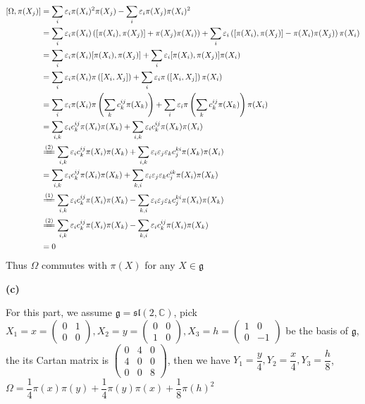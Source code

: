\documentclass[main]{subfiles}
\begin{document}
\begin{align*}\displaystyle
[\Omega,\pi(X_j)]&=\sum_i\varepsilon_i\pi(X_i)^2\pi(X_j)-\sum_i\varepsilon_i\pi(X_j)\pi(X_i)^2 \\
&=\sum_i\varepsilon_i\pi(X_i)\left([\pi(X_i),\pi(X_j)]+\pi(X_j)\pi(X_i)\right)+\sum_i\varepsilon_i\left([\pi(X_i),\pi(X_j)]-\pi(X_i)\pi(X_j)\right)\pi(X_i) \\
&=\sum_i\varepsilon_i\pi(X_i)[\pi(X_i),\pi(X_j)]+\sum_i\varepsilon_i[\pi(X_i),\pi(X_j)]\pi(X_i) \\
&=\sum_i\varepsilon_i\pi(X_i)\pi\left([X_i,X_j]\right)+\sum_i\varepsilon_i\pi\left([X_i,X_j]\right)\pi(X_i) \\
&=\sum_i\varepsilon_i\pi(X_i)\pi\left(\sum_kc_k^{ij}\pi(X_k)\right)+\sum_i\varepsilon_i\pi\left(\sum_kc_k^{ij}\pi(X_k)\right)\pi(X_i) \\
&=\sum_{i,k}\varepsilon_i c_k^{ij}\pi(X_i)\pi(X_k)+\sum_{i,k}\varepsilon_i c_k^{ij}\pi(X_k)\pi(X_i) \\
&\xequal{(2)}\sum_{i,k}\varepsilon_i c_k^{ij}\pi(X_i)\pi(X_k)+\sum_{i,k}\varepsilon_i\varepsilon_j\varepsilon_k c_j^{ki}\pi(X_k)\pi(X_i) \\
&=\sum_{i,k}\varepsilon_i c_k^{ij}\pi(X_i)\pi(X_k)+\sum_{k,i}\varepsilon_i\varepsilon_j\varepsilon_k c_j^{ik}\pi(X_i)\pi(X_k) \\
&\xequal{(1)}\sum_{i,k}\varepsilon_i c_k^{ij}\pi(X_i)\pi(X_k)-\sum_{k,i}\varepsilon_i\varepsilon_j\varepsilon_k c_j^{ki}\pi(X_i)\pi(X_k) \\
&\xequal{(2)}\sum_{i,k}\varepsilon_i c_k^{ij}\pi(X_i)\pi(X_k)-\sum_{k,i}\varepsilon_i c_k^{ij}\pi(X_i)\pi(X_k) \\
&=0
\end{align*}
Thus $\Omega$ commutes with $\pi(X)$ for any $X\in\mathfrak{g}$ \par
\textbf{(c)} \par
For this part, we assume $\mathfrak{g}=\mathfrak{sl}(2,\mathbb C)$, pick $X_1=x=\begin{pmatrix}
0&1 \\
0&0
\end{pmatrix}, X_2=y=\begin{pmatrix}
0&0 \\
1&0
\end{pmatrix}, X_3=h=\begin{pmatrix}
1&0 \\
0&-1
\end{pmatrix}$ be the basis of $\mathfrak{g}$, the its Cartan matrix is $\begin{pmatrix}
0&4&0 \\
4&0&0 \\
0&0&8
\end{pmatrix}$, then we have $Y_1=\dfrac{y}{4},Y_2=\dfrac{x}{4},Y_3=\dfrac{h}{8}$, $\Omega=\dfrac{1}{4}\pi(x)\pi(y)+\dfrac{1}{4}\pi(y)\pi(x)+\dfrac{1}{8}\pi(h)^2$ \\
\end{document}
